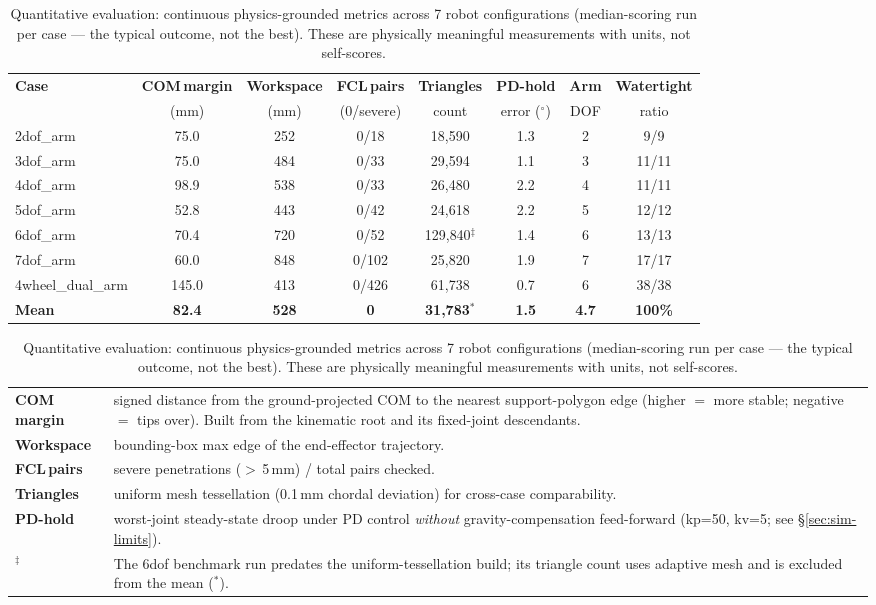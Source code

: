 \documentclass[conference]{IEEEtran}
\begin{document}
\begin{table}[t]
\centering
\caption{Quantitative evaluation: continuous physics-grounded metrics across 7 robot configurations (median-scoring run per case --- the typical outcome, not the best). These are physically meaningful measurements with units, not self-scores.}
\label{tab:quant}
\small
\begin{tabular}{l|cccc|ccc}
\toprule
\textbf{Case} & \textbf{COM\,margin} & \textbf{Workspace} & \textbf{FCL\,pairs} & \textbf{Triangles} & \textbf{PD-hold} & \textbf{Arm} & \textbf{Watertight} \\
 & (mm) & (mm) & (0/severe) & count & error ($^\circ$) & DOF & ratio \\
\midrule
2dof\_arm & 75.0 & 252 & 0/18 & 18{,}590 & 1.3 & 2 & 9/9 \\
3dof\_arm & 75.0 & 484 & 0/33 & 29{,}594 & 1.1 & 3 & 11/11 \\
4dof\_arm & 98.9 & 538 & 0/33 & 26{,}480 & 2.2 & 4 & 11/11 \\
5dof\_arm & 52.8 & 443 & 0/42 & 24{,}618 & 2.2 & 5 & 12/12 \\
6dof\_arm & 70.4 & 720 & 0/52 & 129{,}840$^\ddagger$ & 1.4 & 6 & 13/13 \\
7dof\_arm & 60.0 & 848 & 0/102 & 25{,}820 & 1.9 & 7 & 17/17 \\
4wheel\_dual\_arm & 145.0 & 413 & 0/426 & 61{,}738 & 0.7 & 6 & 38/38 \\
\midrule
\textbf{Mean} & \textbf{82.4} & \textbf{528} & \textbf{0} & \textbf{31{,}783}$^*$ & \textbf{1.5} & \textbf{4.7} & \textbf{100\%} \\
\bottomrule
\end{tabular}
\vspace{1mm}
\footnotesize
\begin{tabularx}{\textwidth}{@{}lX@{}}
\textbf{COM\,margin} & signed distance from the ground-projected COM to the nearest support-polygon edge (higher $=$ more stable; negative $=$ tips over). Built from the kinematic root and its fixed-joint descendants.\\
\textbf{Workspace} & bounding-box max edge of the end-effector trajectory.\\
\textbf{FCL\,pairs} & severe penetrations ($>$\,5\,mm) / total pairs checked.\\
\textbf{Triangles} & uniform mesh tessellation (0.1\,mm chordal deviation) for cross-case comparability.\\
\textbf{PD-hold} & worst-joint steady-state droop under PD control \emph{without} gravity-compensation feed-forward (kp=50, kv=5; see \S\ref{sec:sim-limits}).\\
$^\ddagger$ & The 6dof benchmark run predates the uniform-tessellation build; its triangle count uses adaptive mesh and is excluded from the mean ($^*$).\\
\end{tabularx}
\end{table}
\end{document}
